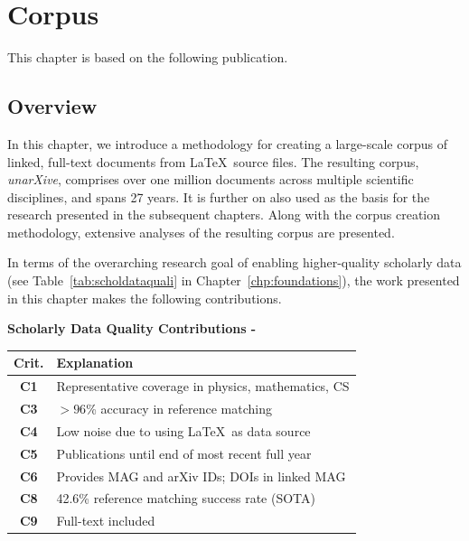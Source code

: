 \chapter{Corpus}
\label{chp:corpus}

This chapter is based on the following publication.

\begin{infobox-pub}
\end{infobox-pub}

\section{Overview}
In this chapter, we introduce a methodology for creating a large-scale corpus of linked, full-text documents from \LaTeX\ source files. The resulting corpus, \emph{unarXive}, comprises over one million documents across multiple scientific disciplines, and spans 27 years. It is further on also used as the basis for the research presented in the subsequent chapters. Along with the corpus creation methodology, extensive analyses of the resulting corpus are presented.

In terms of the overarching research goal of enabling higher-quality scholarly data (see Table~\ref{tab:scholdataquali} in Chapter~\ref{chp:foundations}), the work presented in this chapter makes the following contributions.

\begin{infobox-progress}
      \textbf{Scholarly Data Quality Contributions - \cite{Saier2020}}\vspace{0.5em}

      \begin{tabular}{cp{11.3cm}}
        \toprule
        Crit. & Explanation \\
        \midrule
        \textbf{C1} & Representative coverage in physics, mathematics, CS \\
        \textbf{C3} & $>96$\% accuracy in reference matching \\
        \textbf{C4} & Low noise due to using \LaTeX\ as data source \\
        \textbf{C5} & Publications until end of most recent full year \\
        \textbf{C6} & Provides MAG and arXiv IDs; DOIs in linked MAG \\
        \textbf{C8} & 42.6\% reference matching success rate (SOTA) \\
        \textbf{C9} & Full-text included \\
        \bottomrule
      \end{tabular}
\end{infobox-progress}

